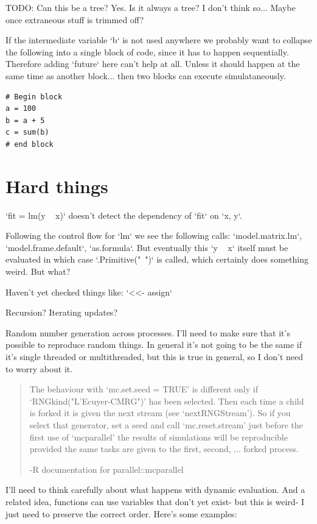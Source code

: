 \documentclass[12pt]{article}
\begin{document}
TODO:
Can this be a tree? Yes. Is it always a tree? I don't think so... Maybe
once extraneous stuff is trimmed off?

If the intermediate variable `b` is not used anywhere we probably want to
collapse the following into a single block of code, since it has to happen
sequentially. Therefore adding `future` here can't help at all. Unless it
should happen at the same time as another block... then two blocks can
execute simulataneously.

\begin{verbatim}
# Begin block
a = 100
b = a + 5
c = sum(b)
# end block
\end{verbatim}

\section{Hard things}

`fit = lm(y ~ x)` doesn't detect the dependency of `fit` on `x, y`.

Following the control flow for `lm` we see the following calls:
`model.matrix.lm`, `model.frame.default`, `as.formula`. But eventually this
`y ~ x` itself must be evaluated in which case `.Primitive("~")` is called,
which certainly does something weird. But what?

Haven't yet checked things like:
`<<- assign`

Recursion? Iterating updates?

Random number generation across processes. I'll need to make sure that it's
possible to reproduce random things. In general it's not going to be the
same if it's single threaded or multithreaded, but this is true in general,
so I don't need to worry about it.

\begin{quote}
     The behaviour with ‘mc.set.seed = TRUE’ is different only if
     ‘RNGkind("L'Ecuyer-CMRG")’ has been selected.  Then each time a child
     is forked it is given the next stream (see ‘nextRNGStream’).  So if
     you select that generator, set a seed and call ‘mc.reset.stream’ just
     before the first use of ‘mcparallel’ the results of simulations will
     be reproducible provided the same tasks are given to the first,
     second, ...  forked process.

     -R documentation for parallel::mcparallel
\end{quote}

I'll need to think carefully about what happens with dynamic evaluation.
And a related idea, functions can use variables that don't yet exist- but this
is weird- I just need to preserve the correct order. Here's some examples:
\end{document}
